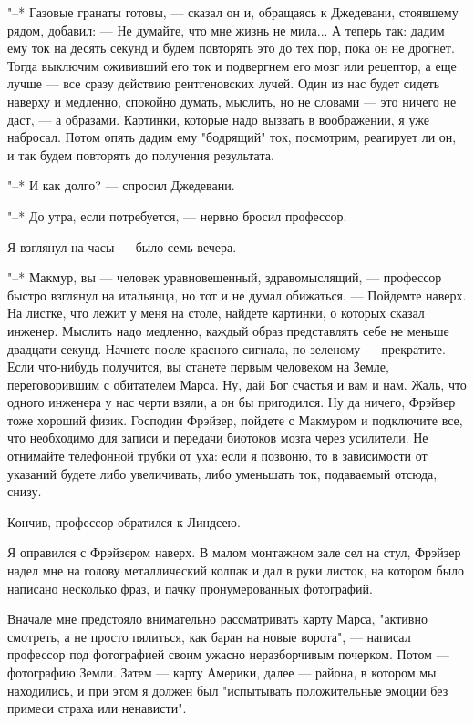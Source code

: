 "--* Газовые гранаты  готовы,  ---  сказал  он  и,  обращаясь  к  Джедевани,
стоявшему рядом, добавил: --- Не думайте, что мне жизнь не мила... А  теперь
так: дадим ему ток на десять секунд и будем повторять это до тех пор, пока
он не дрогнет. Тогда выключим ожививший его ток и подвергнем его мозг  или
рецептор, а еще лучше --- все сразу действию рентгеновских  лучей.  Один  из
нас будет сидеть наверху и  медленно,  спокойно  думать,  мыслить,  но  не
словами --- это ничего не даст, --- а образами. Картинки, которые надо вызвать
в воображении, я уже набросал.  Потом  опять  дадим  ему  "бодрящий"  ток,
посмотрим, реагирует ли он, и так будем повторять до получения результата.

"--* И как долго? --- спросил Джедевани.

"--* До утра, если потребуется, --- нервно бросил профессор.

Я взглянул на часы --- было семь вечера.

"--* Макмур, вы ---  человек  уравновешенный,  здравомыслящий,  ---  профессор
быстро взглянул на итальянца, но тот и  не  думал  обижаться.  ---  Пойдемте
наверх. На листке, что лежит у меня на столе, найдете картинки, о  которых
сказал инженер. Мыслить надо медленно, каждый образ представлять  себе  не
меньше двадцати секунд. Начнете после  красного  сигнала,  по  зеленому  ---
прекратите. Если что-нибудь получится,  вы  станете  первым  человеком  на
Земле, переговорившим с обитателем Марса. Ну, дай Бог счастья и вам и нам.
Жаль, что одного инженера у нас черти взяли, а он  бы  пригодился.  Ну  да
ничего, Фрэйзер тоже хороший физик. Господин Фрэйзер, пойдете с Макмуром и
подключите все, что необходимо для записи и передачи биотоков мозга  через
усилители. Не отнимайте телефонной трубки от уха: если  я  позвоню,  то  в
зависимости от указаний  будете  либо  увеличивать,  либо  уменьшать  ток,
подаваемый отсюда, снизу.

Кончив, профессор обратился к Линдсею.

Я оправился с Фрэйзером наверх. В малом монтажном  зале  сел  на  стул,
Фрэйзер надел мне на голову металлический колпак и дал в руки  листок,  на
котором было написано несколько фраз, и пачку пронумерованных фотографий.

Вначале мне предстояло внимательно рассматривать карту Марса,  "активно
смотреть, а не просто пялиться, как баран  на  новые  ворота",  ---  написал
профессор под фотографией своим ужасно  неразборчивым  почерком.  Потом  ---
фотографию Земли. Затем --- карту Америки, далее  ---  района,  в  котором  мы
находились, и при этом я должен был "испытывать положительные  эмоции  без
примеси страха или ненависти".


